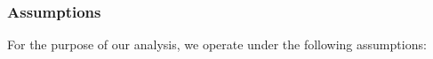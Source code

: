 \documentclass[pdftex,twocolumn,epjc3]{svjour3}
\begin{document}



\subsubsection{Assumptions}\label{sec:assumptions}

For the purpose of our analysis, we operate under the following assumptions:
\end{document}
